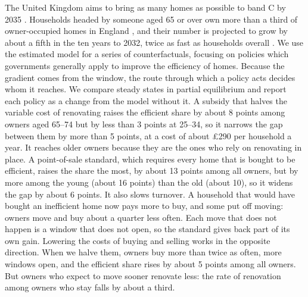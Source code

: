 The United Kingdom aims to bring as many
homes as possible to band C by 2035 \citep{hmg2017cleangrowth}.
Households headed by someone aged 65 or over own more than a third of
owner-occupied homes in England \citep{mhclg2024ehs}, and their number is
projected to grow by about a fifth in the ten years to 2032, twice as fast
as households overall \citep{ons2025households}. We use the estimated model for a series of counterfactuals, focusing on policies which governments generally apply to improve the efficiency of homes. Because the gradient
comes from the window, the route through which a policy acts decides whom
it reaches. We compare steady states in partial equilibrium and report each
policy as a change from the model without it. A
subsidy that halves the variable cost of renovating raises the efficient
share by about 8 points among owners aged 65--74 but by less than 3 points
at 25--34, so it narrows the gap between them by more than 5 points, at a
cost of about \pounds290 per household a year. It reaches older owners because they
are the ones who rely on renovating in place. A point-of-sale standard,
which requires every home that is bought to be efficient, raises the share
the most, by about 13 points among all owners, but by more among the young
(about 16 points) than the old (about 10), so it widens the gap by about 6
points. It also slows turnover. A household that would have bought an
inefficient home now pays more to buy, and some put off moving: owners move
and buy about a quarter less often. Each move that does not happen is a
window that does not open, so the standard gives back part of its own
gain. Lowering the costs of buying and selling works in the opposite
direction. When we halve them, owners buy more than twice as often, more
windows open, and the efficient share rises by about 5 points among all
owners. But owners who expect to move sooner renovate less: the rate of
renovation among owners who stay falls by about a third.

